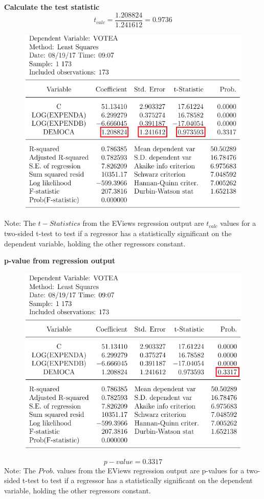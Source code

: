 \documentclass[12pt]{report}
\begin{document}
\noindent \textbf{Calculate the test statistic}
$$t_{calc} = \dfrac{1.208824}{1.241612} = 0.9736$$
\begin{figure}[H]
	\centering
	\includegraphics{q1_9}
\end{figure}
\vspace{-\baselineskip}
\noindent Note: The $t-Statistics$ from the EViews regression output are $t_{calc}$ values for a two-sided t-test to test if a regressor has a statistically significant on the dependent variable, holding the other regressors constant.

\newpage
\noindent \textbf{p-value from regression output}
\begin{figure}[H]
	\centering
	\includegraphics{q1_10}
\end{figure}
\vspace{-\baselineskip}
$$p-value = 0.3317$$
\noindent Note: The $Prob.$ values from the EViews regression output are p-values for a two-sided t-test to test if a regressor has a statistically significant on the dependent variable, holding the other regressors constant.
\end{document}

